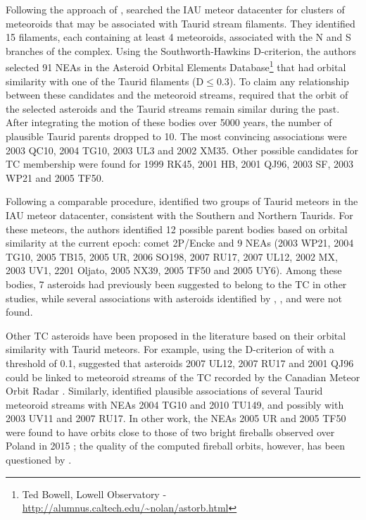 \documentclass[letters,a4paper,fleqn,usenatbib]{mnras}
\begin{document}
Following the approach of \cite{Steel1991}, \cite{Porubcan2004} searched the IAU meteor datacenter for clusters of meteoroids that may be associated with Taurid stream filaments. They identified 15 filaments, each containing at least 4 meteoroids, associated with  the N and S branches of the complex. Using the Southworth-Hawkins D-criterion, the authors selected 91 NEAs in the Asteroid Orbital Elements Database\footnote{Ted Bowell, Lowell Observatory - \url{http://alumnus.caltech.edu/~nolan/astorb.html}} that had orbital similarity with one of the Taurid filaments (D$\leq$0.3). 
To claim any relationship between these candidates and the meteoroid streams, \cite{Porubcan2004} required that the orbit of the selected asteroids and the Taurid streams remain similar during the past. After integrating the motion of these bodies over 5000 years, the number of plausible Taurid parents dropped to 10. The most convincing associations were  2003 QC10, 2004 TG10, 2003 UL3 and 2002 XM35. Other possible candidates for TC membership were found for 1999 RK45, 2001 HB, 2001 QJ96, 2003 SF, 2003 WP21 and 2005 TF50. 

Following a comparable procedure, \cite{Jopek2011} identified two groups of Taurid meteors in the IAU meteor datacenter, consistent with the Southern and Northern Taurids. For these meteors, the authors identified 12 possible parent bodies based on orbital similarity at the current epoch: comet 2P/Encke and 9 NEAs (2003 WP21, 2004 TG10, 2005 TB15, 2005 UR, 2006 SO198, 2007 RU17, 2007 UL12, 2002 MX, 2003 UV1, 2201 Oljato, 2005 NX39, 2005 TF50 and 2005 UY6). Among these bodies, 7 asteroids had previously been suggested to belong to the TC in other studies, while several associations with asteroids identified by \cite{Asher1993} \cite{Asher1994}, \cite{Babadzhanov2001}, \cite{Porubcan2006} and \cite{Babadzhanov2008} were not found. 

Other TC asteroids have been proposed in the literature based on their orbital similarity with Taurid meteors. For example, using the D-criterion of \cite{Drummond1981} with a threshold of 0.1, \cite{Brown2010} suggested that asteroids 2007 UL12, 2007 RU17 and 2001 QJ96 could be linked to meteoroid streams of the TC recorded by the Canadian Meteor Orbit Radar \citep{Brown2008,Brown2010}. Similarly, \cite{Dumitru2017} identified plausible associations of several Taurid meteoroid streams with NEAs 2004 TG10 and 2010 TU149, and possibly with 2003 UV11 and 2007 RU17. In other work, the NEAs 2005 UR and 2005 TF50 were found to have orbits close to those of two bright fireballs observed over Poland in 2015 \citep{Olech2016} ; the quality of the computed fireball orbits, however, has been questioned by \cite{Spurny2017}. 
\end{document}
